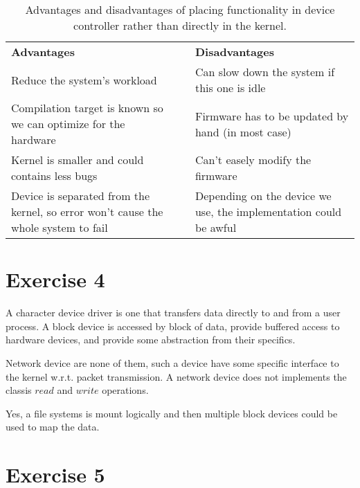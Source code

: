 \documentclass[a4paper,11pt]{report}
\begin{document}
\begin{table}[h]
\centering
\caption{Advantages and disadvantages of placing functionality in device
  controller rather than directly in the kernel.}
\label{my-label}
\begin{tabularx}{\textwidth}{|X|c|X|}
\cline{1-1} \cline{3-3}
\textbf{Advantages}                                                                & \textbf{} & \textbf{Disadvantages}                                            \\ \cline{1-1} \cline{3-3} 
Reduce the system's workload                                                       &           & Can slow down the system if this one is idle                      \\ \cline{1-1} \cline{3-3} 
Compilation target is known so we can optimize for the hardware                    &           & Firmware has to be updated by hand (in most case)                 \\ \cline{1-1} \cline{3-3} 
Kernel is smaller and could contains less bugs                                     &           & Can't easely modify the firmware                                  \\ \cline{1-1} \cline{3-3} 
Device is separated from the kernel, so error won't cause the whole system to fail &           & Depending on the device we use, the implementation could be awful \\ \cline{1-1} \cline{3-3} 
\end{tabularx}
\end{table}

\section*{Exercise 4}

A character device driver is one that transfers data directly to and from a user
process. A block device is accessed by block of data, provide buffered access to
hardware devices, and provide some abstraction from their specifics.

Network device are none of them, such a device have some specific interface to
the kernel w.r.t. packet transmission. A network device does not implements the
classis $read$ and $write$ operations.

Yes, a file systems is mount logically and then multiple block devices could be
used to map the data.

\section*{Exercise 5}
\end{document}
